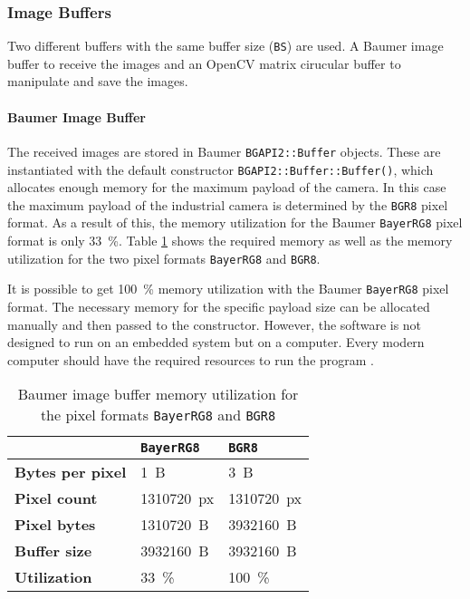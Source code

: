 \subsubsection{Image Buffers}
\label{subsubsec:buffers}

Two different buffers with the same buffer size (\texttt{BS}) are used.
A Baumer image buffer to receive the images and an OpenCV matrix cirucular buffer to manipulate and save the images.

\paragraph{Baumer Image Buffer}
The received images are stored in Baumer \texttt{BGAPI2::Buffer} objects.
These are instantiated with the default constructor \texttt{BGAPI2::Buffer::Buffer()}, which allocates enough memory for the maximum payload of the camera.
In this case the maximum payload of the industrial camera is determined by the \texttt{BGR8} pixel format.
As a result of this, the memory utilization for the Baumer \texttt{BayerRG8} pixel format is only \SI{33}{\percent}.
Table \ref{tab:buffer_memory_utilization} shows the required memory as well as the memory utilization for the two pixel formats \texttt{BayerRG8} and \texttt{BGR8}.

\clearpage

It is possible to get \SI{100}{\percent} memory utilization with the Baumer \texttt{BayerRG8} pixel format.
The necessary memory for the specific payload size can be allocated manually and then passed to the constructor.
However, the software is not designed to run on an embedded system but on a computer.
Every modern computer should have the required resources to run the program \cite{baumer_gapi}.

\begin{table}[t]
  \caption{Baumer image buffer memory utilization for the pixel formats \texttt{BayerRG8} and \texttt{BGR8}}
  \label{tab:buffer_memory_utilization}
  \centering
  \begin{tabular}{lll}
    \toprule
     & \textbf{\texttt{BayerRG8}} & \textbf{\texttt{BGR8}} \\
    \midrule
    \textbf{Bytes per pixel} & \SI{1}{B} & \SI{3}{B} \\
    \textbf{Pixel count} & \SI{1310720}{px} & \SI{1310720}{px} \\
    \textbf{Pixel bytes} & \SI{1310720}{B} & \SI{3932160}{B} \\
    \textbf{Buffer size} & \SI{3932160}{B} & \SI{3932160}{B} \\
    \textbf{Utilization} & \SI{33}{\percent} & \SI{100}{\percent} \\
    \bottomrule
  \end{tabular}
\end{table}

